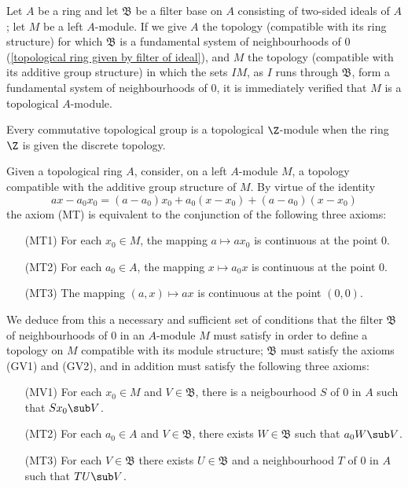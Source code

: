 \begin{example}
Let $A$ be a ring and let $\mathfrak{B}$ be a filter base on $A$ consisting of two-sided ideals of $A$; let $M$ be a left $A$-module. If we give $A$ the topology (compatible with its ring structure) for which $\mathfrak{B}$ is a fundamental system of neighbourhoods of $0$ (\cref{topological ring given by filter of ideal}), and $M$ the topology (compatible with its additive group structure) in which the sets $IM$, as $I$ runs through $\mathfrak{B}$, form a fundamental system of neighbourhoods of $0$, it is immediately verified that $M$ is a topological $A$-module.
\end{example}
\begin{example}
Every commutative topological group is a topological $\Z$-module when the ring $\Z$ is given the discrete topology.
\end{example}
Given a topological ring $A$, consider, on a left $A$-module $M$, a topology compatible with the additive group structure of $M$. By virtue of the identity
\[ax-a_0x_0=(a-a_0)x_0+a_0(x-x_0)+(a-a_0)(x-x_0)\]
the axiom (MT) is equivalent to the conjunction of the following three axioms:
\begin{enumerate}[leftmargin=40pt]
\item[(MT1)] For each $x_0\in M$, the mapping $a\mapsto ax_0$ is continuous at the point $0$.
\item[(MT2)] For each $a_0\in A$, the mapping $x\mapsto a_0x$ is continuous at the point $0$.
\item[(MT3)] The mapping $(a,x)\mapsto ax$ is continuous at the point $(0,0)$.
\end{enumerate}
We deduce from this a necessary and sufficient set of conditions that the filter $\mathfrak{B}$ of neighbourhoods of $0$ in an $A$-module $M$ must satisfy in order to define a topology on $M$ compatible with its module structure; $\mathfrak{B}$ must satisfy the axioms (GV1) and (GV2), and in addition must satisfy the following three axioms:
\begin{enumerate}[leftmargin=40pt]
\item[(MV1)] For each $x_0\in M$ and $V\in\mathfrak{B}$, there is a neigbourhood $S$ of $0$ in $A$ such that $Sx_0\sub V$.
\item[(MT2)] For each $a_0\in A$ and $V\in\mathfrak{B}$, there exists $W\in\mathfrak{B}$ such that $a_0W\sub V$.
\item[(MT3)] For each $V\in\mathfrak{B}$ there exists $U\in\mathfrak{B}$ and a neighbourhood $T$ of $0$ in $A$ such that $TU\sub V$.
\end{enumerate}

